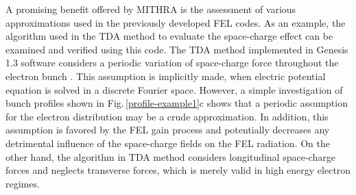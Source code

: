 A promising benefit offered by MITHRA is the assessment of various approximations used in the previously developed FEL codes.
%
As an example, the algorithm used in the TDA method to evaluate the space-charge effect can be examined and verified using this code.
%
The TDA method implemented in Genesis 1.3 software considers a periodic variation of space-charge force throughout the electron bunch \cite{tranFEL,reiche2000numerical}.
%
This assumption is implicitly made, when electric potential equation is solved in a discrete Fourier space.
%
However, a simple investigation of bunch profiles shown in Fig.\,\ref{profile-example1}c shows that a periodic assumption for the electron distribution may be a crude approximation.
%
In addition, this assumption is favored by the FEL gain process and potentially decreases any detrimental influence of the space-charge fields on the FEL radiation.
%
On the other hand, the algorithm in TDA method considers longitudinal space-charge forces and neglects transverse forces, which is merely valid in high energy electron regimes.

